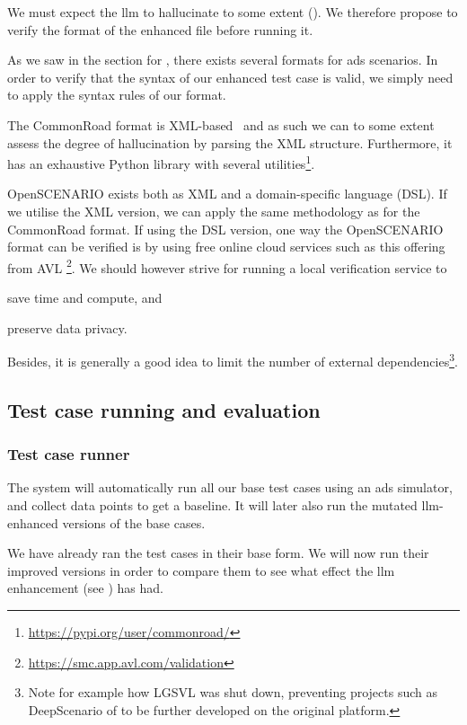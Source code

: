 We must expect the \acrshort{llm} to hallucinate to some extent (). We
therefore propose to verify the format of the enhanced file before running it.

As we saw in the section for , there exists several formats for
\acrshort{ads} scenarios. In order to verify that the syntax of our enhanced test
case is valid, we simply need to apply the syntax rules of our format.

The CommonRoad format is XML-based~\cite[720]{commonRoadOG} and as such we can
to some extent assess the degree of hallucination by parsing the XML structure.
Furthermore, it has an exhaustive Python library with several utilities\footnote{\url{https://pypi.org/user/commonroad/}}.

OpenSCENARIO exists both as XML and a domain-specific language (DSL). If we
utilise the XML version, we can apply the same methodology as for the CommonRoad
format. If using the DSL version, one way
the OpenSCENARIO format can be verified is by using free
online cloud services such as this offering from AVL
\footnote{\url{https://smc.app.avl.com/validation}}. We should however strive for
running a local verification service to \begin{inparaenum}
    \item save time and compute,
    and
    \item preserve data privacy.
\end{inparaenum}
Besides, it is generally a good idea to limit the number of external dependencies\footnote{Note for
    example how LGSVL\cite{lgsvl} was shut down, preventing projects such as DeepScenario of
    \citeauthor{DeepScenario} to be further developed on the original platform.}.

\subsection{Test case running and evaluation}

\subsubsection{Test case runner}

The system will automatically run all
our base test cases using an \acrshort{ads} simulator, and collect data points to get a baseline. It
will later also run the mutated \acrshort{llm}-enhanced versions of the base cases.

We have already ran the test cases in their base form. We will now run their
improved versions in order to compare them to see what effect the \acrshort{llm}
enhancement (see ) has had.

